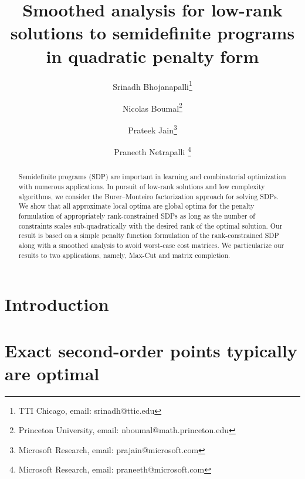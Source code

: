 \documentclass{article}
\title{Smoothed analysis for low-rank solutions to semidefinite programs in quadratic penalty form} %
\author{Srinadh Bhojanapalli\thanks{TTI Chicago, email: srinadh@ttic.edu } \and Nicolas Boumal\thanks{Princeton University, email: nboumal@math.princeton.edu} \and Prateek Jain\thanks{Microsoft Research, email: prajain@microsoft.com} \and Praneeth Netrapalli \thanks{Microsoft Research, email: praneeth@microsoft.com}}
\date{}
\begin{document}
\maketitle

\begin{abstract}
Semidefinite programs (SDP) are important in learning and combinatorial optimization with numerous applications. In pursuit of low-rank solutions and low complexity algorithms, we consider the Burer--Monteiro factorization approach for solving SDPs. We show that all approximate local optima are global optima for the penalty formulation of appropriately rank-constrained SDPs as long as the number of constraints scales sub-quadratically with the desired rank of the optimal solution. Our result is based on a simple penalty function formulation of the rank-constrained SDP along with a smoothed analysis to avoid worst-case cost matrices. We particularize our results to two applications, namely, Max-Cut and matrix completion. 




\end{abstract}



\section{Introduction}
\label{sec:intro}


\section{Exact second-order points typically are optimal}
\label{sec:exact}

\end{document}
